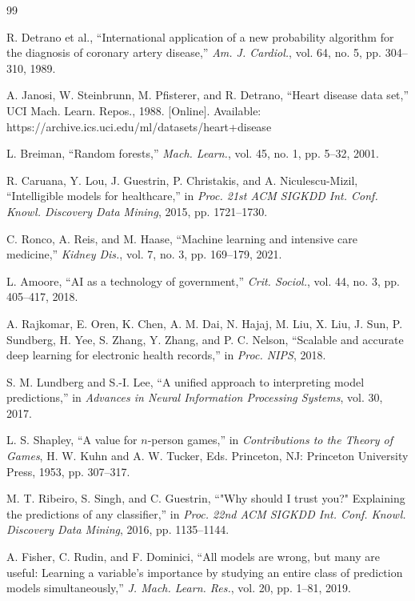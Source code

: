 \documentclass[journal]{IEEEtran}
\begin{document}
\begin{thebibliography}{99}

R. Detrano et al., ``International application of a new probability algorithm for the diagnosis of coronary artery disease,'' \textit{Am. J. Cardiol.}, vol. 64, no. 5, pp. 304--310, 1989.

A. Janosi, W. Steinbrunn, M. Pfisterer, and R. Detrano, ``Heart disease data set,'' UCI Mach. Learn. Repos., 1988. [Online]. Available: https://archive.ics.uci.edu/ml/datasets/heart+disease

L. Breiman, ``Random forests,'' \textit{Mach. Learn.}, vol. 45, no. 1, pp. 5--32, 2001.

R. Caruana, Y. Lou, J. Guestrin, P. Christakis, and A. Niculescu-Mizil, ``Intelligible models for healthcare,'' in \textit{Proc. 21st ACM SIGKDD Int. Conf. Knowl. Discovery Data Mining}, 2015, pp. 1721--1730.

C. Ronco, A. Reis, and M. Haase, ``Machine learning and intensive care medicine,'' \textit{Kidney Dis.}, vol. 7, no. 3, pp. 169--179, 2021.

L. Amoore, ``AI as a technology of government,'' \textit{Crit. Sociol.}, vol. 44, no. 3, pp. 405--417, 2018.

A. Rajkomar, E. Oren, K. Chen, A. M. Dai, N. Hajaj, M. Liu, X. Liu, J. Sun, P. Sundberg, H. Yee, S. Zhang, Y. Zhang, and P. C. Nelson, ``Scalable and accurate deep learning for electronic health records,'' in \textit{Proc. NIPS}, 2018.

S. M. Lundberg and S.-I. Lee, ``A unified approach to interpreting model predictions,'' in \textit{Advances in Neural Information Processing Systems}, vol. 30, 2017.

L. S. Shapley, ``A value for $n$-person games,'' in \textit{Contributions to the Theory of Games}, H. W. Kuhn and A. W. Tucker, Eds. Princeton, NJ: Princeton University Press, 1953, pp. 307--317.

M. T. Ribeiro, S. Singh, and C. Guestrin, ``"Why should I trust you?" Explaining the predictions of any classifier,'' in \textit{Proc. 22nd ACM SIGKDD Int. Conf. Knowl. Discovery Data Mining}, 2016, pp. 1135--1144.

A. Fisher, C. Rudin, and F. Dominici, ``All models are wrong, but many are useful: Learning a variable's importance by studying an entire class of prediction models simultaneously,'' \textit{J. Mach. Learn. Res.}, vol. 20, pp. 1--81, 2019.

\end{thebibliography}
\end{document}
